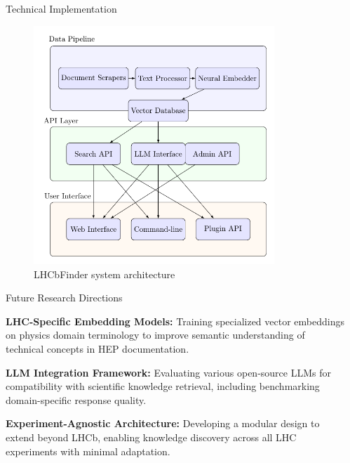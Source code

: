 \documentclass[final]{beamer}
\newlength{\sepwidth}
\newlength{\colwidth}
\newcommand{\separatorcolumn}{\begin{column}{\sepwidth}\end{column}}
\begin{document}
\begin{frame}[t]
\begin{columns}[t]
\begin{column}{\colwidth}
\begin{block}{Technical Implementation}
    \begin{figure}
      \centering
      \includegraphics[width=0.85\textwidth]{figure4-system-architecture.pdf}
      \caption{LHCbFinder system architecture}
    \end{figure}
    
  \end{block}

  \begin{alertblock}{Future Research Directions}
    
    \textbf{LHC-Specific Embedding Models:}
    Training specialized vector embeddings on physics domain terminology to improve semantic understanding of technical concepts in HEP documentation.
    
    \textbf{LLM Integration Framework:}
    Evaluating various open-source LLMs for compatibility with scientific knowledge retrieval, including benchmarking domain-specific response quality.
    
    \textbf{Experiment-Agnostic Architecture:}
    Developing a modular design to extend beyond LHCb, enabling knowledge discovery across all LHC experiments with minimal adaptation.
    
  \end{alertblock}


\end{column}

\separatorcolumn
\end{columns}
\end{frame}
\end{document}
